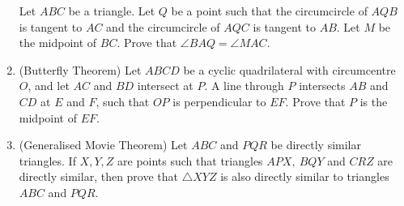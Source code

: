 \documentclass{article}
\begin{document}
\begin{enumerate}
    Let $ABC$ be a triangle. Let $Q$ be a point such that the circumcircle of
    $AQB$ is tangent to $AC$ and the circumcircle of $AQC$ is tangent to $AB$.
    Let $M$ be the midpoint of $BC$.
    Prove that $\angle BAQ=\angle MAC$. 
  \item (Butterfly Theorem)
    Let $ABCD$ be a cyclic quadrilateral with circumcentre $O$, and let $AC$ 
    and $BD$ intersect at $P$. A line through $P$ intersects $AB$ and $CD$ at
    $E$ and $F$, such that $OP$ is perpendicular to $EF$. Prove that $P$ is the midpoint of $EF$. 
  \item (Generalised Movie Theorem)
    Let $ABC$ and $PQR$ be directly similar triangles. If $X, Y, Z$ are points
    such that triangles $APX,\ BQY$ and $CRZ$ are directly similar, then prove that
    $\triangle XYZ$ is also directly similar to triangles $ABC$ and $PQR$.
\end{enumerate}
\end{document}
